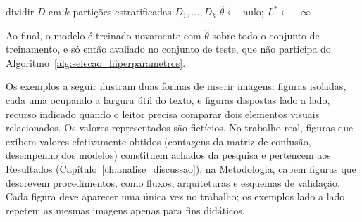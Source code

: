 \begin{algorithm}[H]
  \caption{Seleção de hiperparâmetros por busca em grade com validação cruzada}
  \label{alg:selecao_hiperparametros}
  dividir $D$ em $k$ partições estratificadas $D_1, \dots, D_k$\;
  $\hat{\theta} \leftarrow$ nulo; \quad $L^{*} \leftarrow +\infty$\;
  \Return{$\hat{\theta}$}\;
\end{algorithm}

Ao final, o modelo é treinado novamente com $\hat{\theta}$ sobre todo o conjunto de treinamento, e só então avaliado no conjunto de teste, que não participa do Algoritmo~\ref{alg:selecao_hiperparametros}.

\begin{orientacao}
  Os exemplos a seguir ilustram duas formas de inserir imagens: figuras isoladas, cada uma ocupando a largura útil do texto, e figuras dispostas lado a lado, recurso indicado quando o leitor precisa comparar dois elementos visuais relacionados. Os valores representados são fictícios. No trabalho real, figuras que exibem valores efetivamente obtidos (contagens da matriz de confusão, desempenho dos modelos) constituem achados da pesquisa e pertencem aos Resultados (Capítulo~\ref{ch:analise_discussao}); na Metodologia, cabem figuras que descrevem procedimentos, como fluxos, arquiteturas e esquemas de validação. Cada figura deve aparecer uma única vez no trabalho; os exemplos lado a lado repetem as mesmas imagens apenas para fins didáticos.
\end{orientacao}

